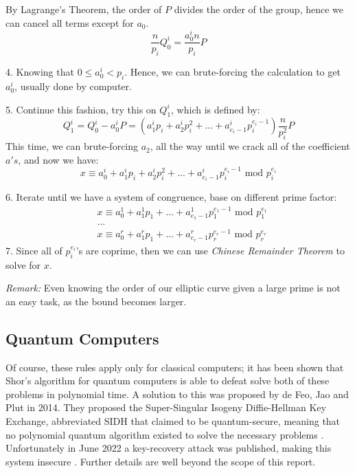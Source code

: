 \documentclass{article}
\theoremstyle{plain}
\theoremstyle{definition}
\begin{document}
\hspace{3em} By Lagrange's Theorem, the order of $P$ divides the order of the group, hence we can cancel all terms except for $a_0$.
\[\frac{n}{p_i}Q_0^i = \frac{a^i_0n}{p_i}P\]

\hspace{2em} 4. Knowing that $ 0 \leq a^i_0 < p_i$. Hence, we can brute-forcing the calculation to get $a^i_0$, usually done by computer.

\hspace{2em} 5. Continue this fashion, try this on $Q_1^i$, which is defined by:
\[Q_1^i = Q_0^i - a^i_0P = (a^i_1p_i + a^i_2p_i^2+...+a^i_{e_i -1}p_i^{e_i -1})\frac{n}{p_i^2}P\]
\hspace{3em} This time, we can brute-forcing $a_2$, all the way until we crack all  of the coefficient $a's$, and now we have:
\[x \equiv a^i_0 +a^i_1p_i + a^i_2p_i^2+...+a^i_{e_i -1}p_i^{e_i -1} \text{ mod }p_i^{e_i}\]

\hspace{2em} 6. Iterate until we have a system of congruence, base on different prime factor:
\begin{align*}
    &x\equiv a^1_0 + a_1^1p_1 + ... +a^1_{e_1-1}p_1^{e_1-1} \text{ mod }p_1^{e_1}\\
    & \dots\\
    &x\equiv a^r_0 + a_1^rp_1 + ... +a^r_{e_r-1}p_r^{e_r-1} \text{ mod }p_r^{e_r}
\end{align*}
\hspace{2em} 7. Since all of $\displaystyle p_i^{e_i}$'s are coprime, then we can use \textit{Chinese Remainder Theorem} to solve for $x$.

\textit{Remark:}
Even knowing the order of our elliptic curve given a large prime is not an easy task, as the bound becomes larger.
                        
                        

        \subsection{Quantum Computers}\label{quantum}

                Of course, these rules apply only for classical computers; it has been shown that Shor's algorithm for quantum computers is able to defeat solve both of these problems in polynomial time.
                A solution to this was proposed by de Feo, Jao and Plut in 2014. They proposed the Super-Singular Isogeny Diffie-Hellman Key Exchange, abbreviated SIDH that claimed to be quantum-secure, meaning that no polynomial quantum algorithm existed to solve the necessary problems \cite{defeojaoplut}.
                Unfortunately in June 2022 a key-recovery attack was published, making this system insecure \cite{cryptoeprint:2022/975}.
                Further details are well beyond the scope of this report.
\end{document}
